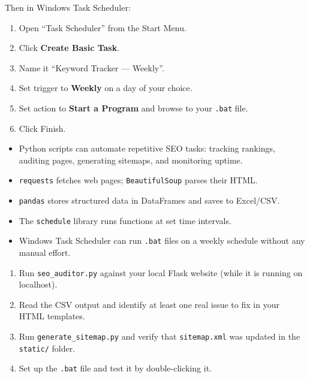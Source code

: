 \documentclass[12pt, a4paper]{book}
\begin{document}
Then in Windows Task Scheduler:
\begin{enumerate}[leftmargin=1.5em]
  \item Open ``Task Scheduler'' from the Start Menu.
  \item Click \textbf{Create Basic Task}.
  \item Name it ``Keyword Tracker --- Weekly''.
  \item Set trigger to \textbf{Weekly} on a day of your choice.
  \item Set action to \textbf{Start a Program} and browse to your \texttt{.bat} file.
  \item Click Finish.
\end{enumerate}

\begin{tcolorbox}[learnedbox]
\begin{itemize}
  \item Python scripts can automate repetitive SEO tasks: tracking rankings, auditing pages, generating sitemaps, and monitoring uptime.
  \item \texttt{requests} fetches web pages; \texttt{BeautifulSoup} parses their HTML.
  \item \texttt{pandas} stores structured data in DataFrames and saves to Excel/CSV.
  \item The \texttt{schedule} library runs functions at set time intervals.
  \item Windows Task Scheduler can run \texttt{.bat} files on a weekly schedule without any manual effort.
\end{itemize}
\end{tcolorbox}

\begin{tcolorbox}[taskbox]
\begin{enumerate}
  \item Run \texttt{seo\_auditor.py} against your local Flask website (while it is running on localhost).
  \item Read the CSV output and identify at least one real issue to fix in your HTML templates.
  \item Run \texttt{generate\_sitemap.py} and verify that \texttt{sitemap.xml} was updated in the \texttt{static/} folder.
  \item Set up the \texttt{.bat} file and test it by double-clicking it.
\end{enumerate}
\end{tcolorbox}
\end{document}
